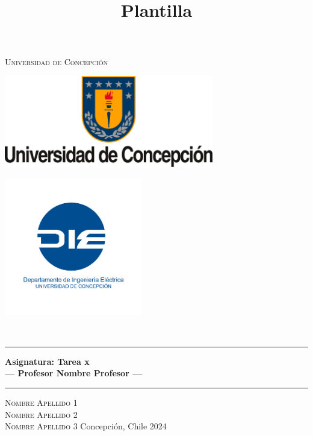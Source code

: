 \title{{\Large \\ Plantilla \\[0.1 cm]}}

\pagestyle{fancy}
\fancyhf{}
\lhead{\thetitle}
\cfoot{\thepage}

\begin{titlepage}
    \newcommand{\drop}{0.1\textheight}
    \newcommand{\halfdrop}{0.05\textheight}
    \vspace*{\drop}
    \begin{center}
    {\LARGE\textsc{Universidad de Concepción}}\\[\drop]
    \begin{minipage}{0.47\linewidth}
        \centering
        {\includegraphics[height=4cm]{extras/logo_udec.png}}
    \end{minipage}
    \begin{minipage}{0.47\linewidth}  %
        \centering
        {\includegraphics[height=6cm]{extras/logo_die.png}}
    \end{minipage}\\[\halfdrop]
    \rule{\textwidth}{1pt}\par
    \vspace{0.5\baselineskip}
    {\huge\bfseries Asignatura: Tarea x\\
    \large --- Profesor Nombre Profesor ---}\\[0.5\baselineskip]
    \rule{\textwidth}{1pt}\par
    \vfill
    {\Large\textsc{Nombre Apellido 1 \\ Nombre Apellido 2 \\[1ex] Nombre Apellido 3}}
    \vfill
    Concepción, Chile
    \vfill
    {\large 2024}
    \end{center}
\end{titlepage}

\fancyfoot[C]{\thepage}  %
\renewcommand{\footrulewidth}{0.4pt}
